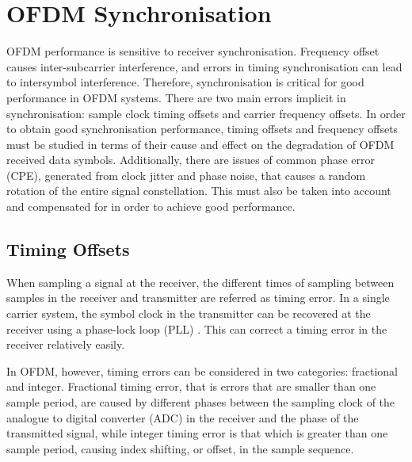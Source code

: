 \section{OFDM Synchronisation}

OFDM performance is sensitive to receiver synchronisation. 
Frequency offset causes inter-subcarrier interference, and errors in timing synchronisation can lead to intersymbol interference. 
Therefore, synchronisation is critical for good performance in OFDM systems. 
There are two main errors implicit in synchronisation: sample clock timing offsets and carrier frequency offsets.
In order to obtain good synchronisation performance, timing offsets and frequency offsets must be studied in terms of their cause and effect on the degradation of OFDM received data symbols.
Additionally, there are issues of common phase error (CPE), generated from clock jitter and phase noise, that causes a random rotation of the entire signal constellation.
This must also be taken into account and compensated for in order to achieve good performance.

\subsection{Timing Offsets}

When sampling a signal at the receiver, the different times of sampling between samples in the receiver and transmitter are referred as timing error.
In a single carrier system, the symbol clock in the transmitter can be recovered at the receiver using a phase-lock loop (PLL) \cite{farhang2008signal}. 
This can correct a timing error in the receiver relatively easily.

In OFDM, however, timing errors can be considered in two categories: fractional and integer. 
Fractional timing error, that is errors that are smaller than one sample period, are caused by different phases between the sampling clock of the analogue to digital converter (ADC) in the receiver and the phase of the transmitted signal, while integer timing error is that which is greater than one sample period, causing index shifting, or offset, in the sample sequence.

